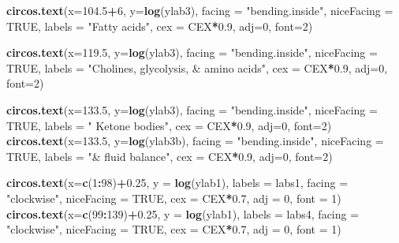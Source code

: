 \documentclass[
]{article}
\newenvironment{Shaded}{\begin{snugshade}}{\end{snugshade}}
\newcommand{\DataTypeTok}[1]{\textcolor[rgb]{0.13,0.29,0.53}{#1}}
\newcommand{\DecValTok}[1]{\textcolor[rgb]{0.00,0.00,0.81}{#1}}
\newcommand{\FloatTok}[1]{\textcolor[rgb]{0.00,0.00,0.81}{#1}}
\newcommand{\KeywordTok}[1]{\textcolor[rgb]{0.13,0.29,0.53}{\textbf{#1}}}
\newcommand{\NormalTok}[1]{#1}
\newcommand{\OperatorTok}[1]{\textcolor[rgb]{0.81,0.36,0.00}{\textbf{#1}}}
\newcommand{\OtherTok}[1]{\textcolor[rgb]{0.56,0.35,0.01}{#1}}
\newcommand{\StringTok}[1]{\textcolor[rgb]{0.31,0.60,0.02}{#1}}
\begin{document}
\begin{Shaded}
\begin{Highlighting}[]
\KeywordTok{circos.text}\NormalTok{(}\DataTypeTok{x=}\FloatTok{104.5}\OperatorTok{+}\DecValTok{6}\NormalTok{, }\DataTypeTok{y=}\KeywordTok{log}\NormalTok{(ylab3), }\DataTypeTok{facing =} \StringTok{"bending.inside"}\NormalTok{, }\DataTypeTok{niceFacing =} \OtherTok{TRUE}\NormalTok{, }\DataTypeTok{labels =} \StringTok{"Fatty acids"}\NormalTok{, }\DataTypeTok{cex =}\NormalTok{ CEX}\OperatorTok{*}\FloatTok{0.9}\NormalTok{, }\DataTypeTok{adj=}\DecValTok{0}\NormalTok{, }\DataTypeTok{font=}\DecValTok{2}\NormalTok{)}

\KeywordTok{circos.text}\NormalTok{(}\DataTypeTok{x=}\FloatTok{119.5}\NormalTok{, }\DataTypeTok{y=}\KeywordTok{log}\NormalTok{(ylab3), }\DataTypeTok{facing =} \StringTok{"bending.inside"}\NormalTok{, }\DataTypeTok{niceFacing =} \OtherTok{TRUE}\NormalTok{, }\DataTypeTok{labels =} \StringTok{"Cholines, glycolysis, & amino acids"}\NormalTok{, }\DataTypeTok{cex =}\NormalTok{ CEX}\OperatorTok{*}\FloatTok{0.9}\NormalTok{, }\DataTypeTok{adj=}\DecValTok{0}\NormalTok{, }\DataTypeTok{font=}\DecValTok{2}\NormalTok{)}

\KeywordTok{circos.text}\NormalTok{(}\DataTypeTok{x=}\FloatTok{133.5}\NormalTok{, }\DataTypeTok{y=}\KeywordTok{log}\NormalTok{(ylab3), }\DataTypeTok{facing =} \StringTok{"bending.inside"}\NormalTok{, }\DataTypeTok{niceFacing =} \OtherTok{TRUE}\NormalTok{, }\DataTypeTok{labels =} \StringTok{"  Ketone bodies"}\NormalTok{, }\DataTypeTok{cex =}\NormalTok{ CEX}\OperatorTok{*}\FloatTok{0.9}\NormalTok{, }\DataTypeTok{adj=}\DecValTok{0}\NormalTok{, }\DataTypeTok{font=}\DecValTok{2}\NormalTok{)}
\KeywordTok{circos.text}\NormalTok{(}\DataTypeTok{x=}\FloatTok{133.5}\NormalTok{, }\DataTypeTok{y=}\KeywordTok{log}\NormalTok{(ylab3b), }\DataTypeTok{facing =} \StringTok{"bending.inside"}\NormalTok{, }\DataTypeTok{niceFacing =} \OtherTok{TRUE}\NormalTok{, }\DataTypeTok{labels =} \StringTok{"& fluid balance"}\NormalTok{, }\DataTypeTok{cex =}\NormalTok{ CEX}\OperatorTok{*}\FloatTok{0.9}\NormalTok{, }\DataTypeTok{adj=}\DecValTok{0}\NormalTok{, }\DataTypeTok{font=}\DecValTok{2}\NormalTok{)}

\KeywordTok{circos.text}\NormalTok{(}\DataTypeTok{x=}\KeywordTok{c}\NormalTok{(}\DecValTok{1}\OperatorTok{:}\DecValTok{98}\NormalTok{)}\OperatorTok{+}\FloatTok{0.25}\NormalTok{,   }\DataTypeTok{y =} \KeywordTok{log}\NormalTok{(ylab1), }\DataTypeTok{labels =}\NormalTok{ labs1, }\DataTypeTok{facing =} \StringTok{"clockwise"}\NormalTok{, }\DataTypeTok{niceFacing =} \OtherTok{TRUE}\NormalTok{, }\DataTypeTok{cex =}\NormalTok{ CEX}\OperatorTok{*}\FloatTok{0.7}\NormalTok{, }\DataTypeTok{adj =} \DecValTok{0}\NormalTok{, }\DataTypeTok{font =} \DecValTok{1}\NormalTok{)}
\KeywordTok{circos.text}\NormalTok{(}\DataTypeTok{x=}\KeywordTok{c}\NormalTok{(}\DecValTok{99}\OperatorTok{:}\DecValTok{139}\NormalTok{)}\OperatorTok{+}\FloatTok{0.25}\NormalTok{, }\DataTypeTok{y =} \KeywordTok{log}\NormalTok{(ylab1), }\DataTypeTok{labels =}\NormalTok{ labs4, }\DataTypeTok{facing =} \StringTok{"clockwise"}\NormalTok{, }\DataTypeTok{niceFacing =} \OtherTok{TRUE}\NormalTok{, }\DataTypeTok{cex =}\NormalTok{ CEX}\OperatorTok{*}\FloatTok{0.7}\NormalTok{, }\DataTypeTok{adj =} \DecValTok{0}\NormalTok{, }\DataTypeTok{font =} \DecValTok{1}\NormalTok{)}
               

\end{Highlighting}
\end{Shaded}
\end{document}
